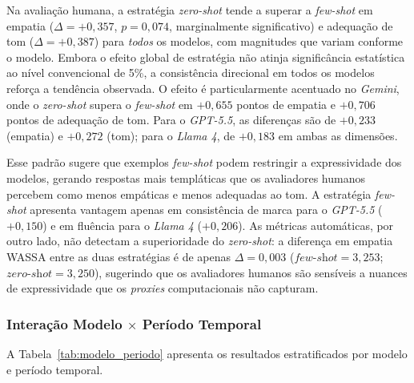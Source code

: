 \documentclass[12pt, a4paper]{article}
\numberwithin{equation}{section}
\begin{document}
Na avaliação humana, a estratégia \textit{zero-shot} tende a superar a \textit{few-shot} em empatia ($\Delta = +0{,}357$, $p = 0{,}074$, marginalmente significativo) e adequação de tom ($\Delta = +0{,}387$) para \textit{todos} os modelos, com magnitudes que variam conforme o modelo. Embora o efeito global de estratégia não atinja significância estatística ao nível convencional de 5\%, a consistência direcional em todos os modelos reforça a tendência observada. O efeito é particularmente acentuado no \textit{Gemini}, onde o \textit{zero-shot} supera o \textit{few-shot} em $+0{,}655$ pontos de empatia e $+0{,}706$ pontos de adequação de tom. Para o \textit{GPT-5.5}, as diferenças são de $+0{,}233$ (empatia) e $+0{,}272$ (tom); para o \textit{Llama 4}, de $+0{,}183$ em ambas as dimensões.

Esse padrão sugere que exemplos \textit{few-shot} podem restringir a expressividade dos modelos, gerando respostas mais templáticas que os avaliadores humanos percebem como menos empáticas e menos adequadas ao tom. A estratégia \textit{few-shot} apresenta vantagem apenas em consistência de marca para o \textit{GPT-5.5} ($+0{,}150$) e em fluência para o \textit{Llama 4} ($+0{,}206$). As métricas automáticas, por outro lado, não detectam a superioridade do \textit{zero-shot}: a diferença em empatia WASSA entre as duas estratégias é de apenas $\Delta = 0{,}003$ ($\textit{few-shot} = 3{,}253$; $\textit{zero-shot} = 3{,}250$), sugerindo que os avaliadores humanos são sensíveis a nuances de expressividade que os \textit{proxies} computacionais não capturam.

\subsubsection{Interação Modelo $\times$ Período Temporal}

A Tabela~\ref{tab:modelo_periodo} apresenta os resultados estratificados por modelo e período temporal.

\begin{table}[H]
\centering
\caption{Avaliação Humana por Modelo e Período (escala Likert 1--5)}
\label{tab:modelo_periodo}
\end{table}
\end{document}
